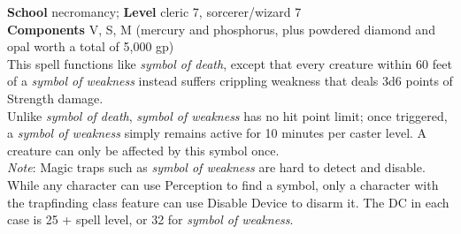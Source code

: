 \textbf{School} necromancy; \textbf{Level} cleric 7, sorcerer/wizard 7\\
\textbf{Components} V, S, M (mercury and phosphorus, plus powdered diamond and opal worth a total of 5,000 gp)\\
This spell functions like \textit{symbol of death}, except that every creature within 60 feet of a \textit{symbol of weakness }instead suffers crippling weakness that deals 3d6 points of Strength damage.\\
Unlike \textit{symbol of death}, \textit{symbol of weakness }has no hit point limit; once triggered, a \textit{symbol of weakness }simply remains active for 10 minutes per caster level. A creature can only be affected by this symbol once.\\
\textit{Note}: Magic traps such as \textit{symbol of weakness }are hard to detect and disable. While any character can use Perception to find a symbol, only a character with the trapfinding class feature can use Disable Device to disarm it. The DC in each case is 25 + spell level, or 32 for \textit{symbol of weakness}.\\
